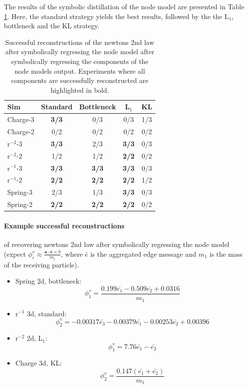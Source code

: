 \documentclass[11pt]{article}
\begin{document}
    The results of the symbolic distillation of the node model are presented in Table \ref{tab:sr_edge_model_table}. Here, the standard strategy yields the best results, followed by the the L$_1$, bottleneck and the KL strategy.
    \begin{table}[H]
        \centering
        \begin{tabular}{lcccc}
        \hline
        Sim & Standard & Bottleneck & L$_1$ & KL \\
        \hline
        Charge-3 & \textbf{3/3} & 0/3 & 0/3 & 1/3 \\
        Charge-2 & 0/2 & 0/2 & 0/2 & 0/2 \\
        r$^{-2}$-3 & \textbf{3/3} & 2/3 & \textbf{3/3} & 0/3 \\
        r$^{-2}$-2 & 1/2 & 1/2 & \textbf{2/2} & 0/2 \\
        r$^{-1}$-3 & \textbf{3/3} & \textbf{3/3} & \textbf{3/3} & 0/3 \\
        r$^{-1}$-2 & \textbf{2/2} & \textbf{2/2} & \textbf{2/2} & 1/2 \\
        Spring-3 & 2/3 & 1/3 & \textbf{3/3}  & 0/3 \\
        Spring-2 & \textbf{2/2} & \textbf{2/2} & \textbf{2/2} & 0/2 \\
        \hline
        \end{tabular}
        \caption{Successful reconstructions of the newtons 2nd law after symbolically regressing the node model after symbolically regressing the components of the node models output. Experiments where all components are successfully reconstructed are highlighted in bold.}
        \label{tab:sr_edge_model_table}
    \end{table}


\paragraph*{Example successful reconstructions} of recovering newtons 2nd law after symbolically regressing the node model (expect $\phi^{v}_i \approx \frac{\mathbf{a} \cdot \mathbf{\bar{e}} + b}{m_1}$, where $\bar{e}$ is the aggregated edge message and $m_1$ is the mass of the receiving particle).
\begin{itemize}
        \item
        Spring 2d, bottleneck:
        $$
        \phi^{v}_1 = \frac{0.199\bar{e_1} - 0.509\bar{e_2} + 0.0316}{m_1}$$
        \item
        r$^{-1}$ 3d, standard:
        $$
        \phi^{v}_2 = -0.00317\bar{e_3} - 0.00379\bar{e_1} - 0.00253\bar{e_2} + 0.00396
        $$
        \item
        r$^{-2}$ 2d, L$_1$:
        $$
        \phi^{v}_1 = 7.76\bar{e_1} - \bar{e_2}
        $$
        \item
        Charge 3d, KL:
        $$
        \phi^{v}_2 = \frac{0.147(\bar{e_1} + \bar{e_2})}{m_1}
        $$
    \end{itemize}
\end{document}
